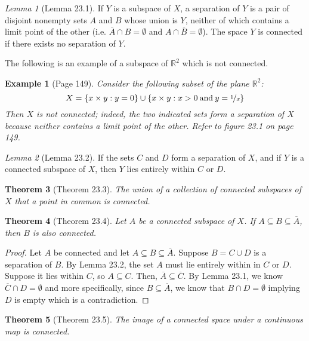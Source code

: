 \documentclass{article}
\newtheorem{theorem}{Theorem}
\newtheorem*{example}{Example}
\theoremstyle{definition}
\theoremstyle{remark}
\newtheorem{lemma}[theorem]{Lemma}
\begin{document}
    \begin{lemma}[Lemma 23.1]
        If $Y$ is a subspace of $X$, a separation of $Y$ is a pair of disjoint nonempty sets $A$ and $B$ whose union is $Y$, neither
        of which contains a limit point of the other (i.e. $\overline{A}\cap B = \emptyset$ and $A\cap\overline{B}=\emptyset$). 
        The space $Y$ is connected if there exists no separation of $Y$.
    \end{lemma}

    The following is an example of a subspace of $\mathbb{R}^2$ which is not connected.
    \begin{example}[Page 149]
        Consider the following subset of the plane $\mathbb{R}^2$:
        \[ X = \{ x\times y: y = 0\} \cup \{x\times y: x > 0\:\text{and}\:y=\nicefrac{1}{x}\} \]
        Then $X$ is not connected; indeed, the two indicated sets form a separation of $X$ because neither contains a limit
        point of the other. Refer to figure 23.1 on page 149.
    \end{example}

    \begin{lemma}[Lemma 23.2]
        If the sets $C$ and $D$ form a separation of $X$, and if $Y$ is a connected subspace of $X$, then $Y$ lies entirely
        within $C$ or $D$.
    \end{lemma}

    \begin{theorem}[Theorem 23.3]
        The union of a collection of connected subspaces of $X$ that a point in common is connected.
    \end{theorem}

    \begin{theorem}[Theorem 23.4]
        Let $A$ be a connected subspace of $X$. If $A\subseteq B\subseteq\overline{A}$, then $B$ is also connected.
    \end{theorem}
    \begin{proof}
        Let $A$ be connected and let $A\subseteq B\subseteq\overline{A}$. Suppose $B = C\cup D$ is a separation of $B$. By Lemma 23.2,
        the set $A$ must lie entirely within in $C$ or $D$. Suppose it lies within $C$, so $A\subseteq C$. Then,
        $\overline{A}\subseteq\overline{C}$. By Lemma 23.1, we know $\overline{C}\cap D=\emptyset$ and more specifically, since
        $B\subseteq\overline{A}$, we know that $B\cap D=\emptyset$ implying $D$ is empty which is a contradiction.
    \end{proof}

    \begin{theorem}[Theorem 23.5]
        The image of a connected space under a continuous map is connected.
    \end{theorem}
\end{document}
